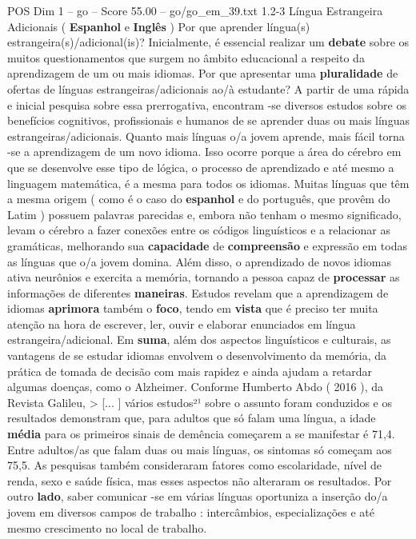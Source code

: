 \begin{textsample}{POS Dim 1 – go – Score 55.00 – go/go\_em\_39.txt}  \label{ex:f1_pos_095}
1.2-3 Língua Estrangeira Adicionais ( \textbf{Espanhol} e \textbf{Inglês} ) Por que aprender língua(s) estrangeira(s)/adicional(is)?
Inicialmente, é essencial realizar um \textbf{debate} sobre os muitos questionamentos que surgem no âmbito educacional a respeito da aprendizagem de um ou mais idiomas.
Por que apresentar uma \textbf{pluralidade} de ofertas de línguas estrangeiras/adicionais ao/à estudante?
A partir de uma rápida e inicial pesquisa sobre essa prerrogativa, encontram -se diversos estudos sobre os benefícios cognitivos, profissionais e humanos de se aprender duas ou mais línguas estrangeiras/adicionais.
Quanto mais línguas o/a jovem aprende, mais fácil torna -se a aprendizagem de um novo idioma.
Isso ocorre porque a área do cérebro em que se desenvolve esse tipo de lógica, o processo de aprendizado e até mesmo a linguagem matemática, é a mesma para todos os idiomas.
Muitas línguas que têm a mesma origem ( como é o caso do \textbf{espanhol} e do português, que provêm do Latim ) possuem palavras parecidas e, embora não tenham o mesmo significado, levam o cérebro a fazer conexões entre os códigos linguísticos e a relacionar as gramáticas, melhorando sua \textbf{capacidade} de \textbf{compreensão} e expressão em todas as línguas que o/a jovem domina.
Além disso, o aprendizado de novos idiomas ativa neurônios e exercita a memória, tornando a pessoa capaz de \textbf{processar} as informações de diferentes \textbf{maneiras}.
Estudos revelam que a aprendizagem de idiomas \textbf{aprimora} também o \textbf{foco}, tendo em \textbf{vista} que é preciso ter muita atenção na hora de escrever, ler, ouvir e elaborar enunciados em língua estrangeira/adicional.
Em \textbf{suma}, além dos aspectos linguísticos e culturais, as vantagens de se estudar idiomas envolvem o desenvolvimento da memória, da prática de tomada de decisão com mais rapidez e ainda ajudam a retardar algumas doenças, como o Alzheimer.
Conforme Humberto Abdo ( 2016 ), da Revista Galileu, > [... ] vários estudos²¹ sobre o assunto foram conduzidos e os resultados demonstram que, para adultos que só falam uma língua, a idade \textbf{média} para os primeiros sinais de demência começarem a se manifestar é 71,4.
Entre adultos/as que falam duas ou mais línguas, os sintomas só começam aos 75,5.
As pesquisas também consideraram fatores como escolaridade, nível de renda, sexo e saúde física, mas esses aspectos não alteraram os resultados.
Por outro \textbf{lado}, saber comunicar -se em várias línguas oportuniza a inserção do/a jovem em diversos campos de trabalho : intercâmbios, especializações e até mesmo crescimento no local de trabalho.

\end{textsample}
